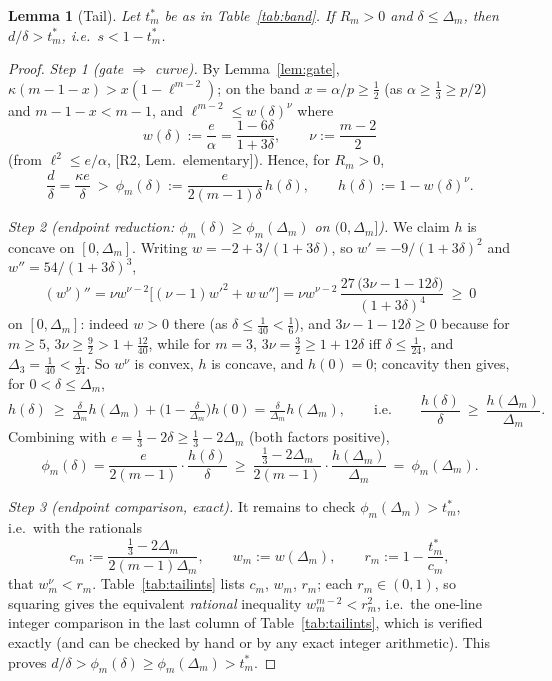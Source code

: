 \documentclass[11pt]{amsart}
\newtheorem{lemma}[theorem]{Lemma}
\begin{document}
\begin{lemma}[Tail]\label{lem:tail}
Let $t_m^*$ be as in Table~\ref{tab:band}.  If $R_m>0$ and
$\delta\le\Delta_m$, then $d/\delta>t^*_m$, i.e.\ $s<1-t^*_m$.
\end{lemma}

\begin{proof}
\emph{Step 1 (gate $\Rightarrow$ curve).}
By Lemma~\ref{lem:gate}, $\kappa(m-1-x)>x(1-\ell^{m-2})$; on the band
$x=\alpha/p\ge\tfrac12$ (as $\alpha\ge\tfrac13\ge p/2$) and $m-1-x<m-1$,
and $\ell^{m-2}\le w(\delta)^{\nu}$ where
\[
 w(\delta):=\frac e\alpha=\frac{1-6\delta}{1+3\delta},\qquad
 \nu:=\frac{m-2}2
\]
(from $\ell^2\le e/\alpha$, [R2, Lem.~elementary]).  Hence, for $R_m>0$,
\begin{equation}\label{eq:phi}
 \frac d\delta=\frac{\kappa e}\delta
 \ >\ \phi_m(\delta):=\frac{e}{2(m-1)\delta}\,h(\delta),
 \qquad h(\delta):=1-w(\delta)^{\nu}.
\end{equation}

\emph{Step 2 (endpoint reduction: $\phi_m(\delta)\ge\phi_m(\Delta_m)$ on
$(0,\Delta_m]$).}
We claim $h$ is concave on $[0,\Delta_m]$.  Writing
$w=-2+3/(1+3\delta)$, so $w'=-9/(1+3\delta)^2$ and $w''=54/(1+3\delta)^3$,
\[
 (w^{\nu})''=\nu w^{\nu-2}\bigl[(\nu-1)w'^2+w\,w''\bigr]
 =\nu w^{\nu-2}\,\frac{27\,\bigl(3\nu-1-12\delta\bigr)}{(1+3\delta)^4}
 \ \ge\ 0
\]
on $[0,\Delta_m]$: indeed $w>0$ there (as $\delta\le\tfrac1{40}<\tfrac16$),
and $3\nu-1-12\delta\ge0$ because for $m\ge5$, $3\nu\ge\tfrac92>1+\tfrac{12}{40}$,
while for $m=3$, $3\nu=\tfrac32\ge1+12\delta$ iff $\delta\le\tfrac1{24}$,
and $\Delta_3=\tfrac1{40}<\tfrac1{24}$.  So $w^{\nu}$ is convex, $h$ is
concave, and $h(0)=0$; concavity then gives, for $0<\delta\le\Delta_m$,
\[
 h(\delta)\ \ge\ \tfrac{\delta}{\Delta_m}h(\Delta_m)
 +\bigl(1-\tfrac{\delta}{\Delta_m}\bigr)h(0)
 =\tfrac{\delta}{\Delta_m}h(\Delta_m),
 \qquad\text{i.e.}\qquad
 \frac{h(\delta)}\delta\ \ge\ \frac{h(\Delta_m)}{\Delta_m}.
\]
Combining with $e=\tfrac13-2\delta\ge\tfrac13-2\Delta_m$ (both factors
positive),
\[
 \phi_m(\delta)=\frac{e}{2(m-1)}\cdot\frac{h(\delta)}{\delta}
 \ \ge\ \frac{\tfrac13-2\Delta_m}{2(m-1)}\cdot\frac{h(\Delta_m)}{\Delta_m}
 \ =\ \phi_m(\Delta_m).
\]

\emph{Step 3 (endpoint comparison, exact).}
It remains to check $\phi_m(\Delta_m)>t^*_m$, i.e.\ with the rationals
\[
 c_m:=\frac{\tfrac13-2\Delta_m}{2(m-1)\Delta_m},\qquad
 w_m:=w(\Delta_m),\qquad r_m:=1-\frac{t^*_m}{c_m},
\]
that $w_m^{\nu}<r_m$.  Table~\ref{tab:tailints} lists $c_m$, $w_m$, $r_m$;
each $r_m\in(0,1)$, so squaring gives the equivalent \emph{rational}
inequality $w_m^{m-2}<r_m^2$, i.e.\ the one-line integer comparison in the
last column of Table~\ref{tab:tailints}, which is verified exactly (and can
be checked by hand or by any exact integer arithmetic).  This proves
$d/\delta>\phi_m(\delta)\ge\phi_m(\Delta_m)>t^*_m$.
\end{proof}
\end{document}
